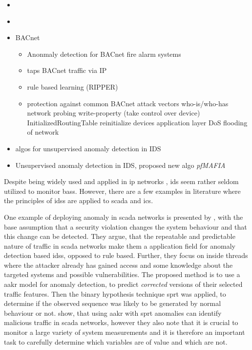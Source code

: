 

\begin{itemize}
	\item \parencite{Yang2006}
	\item \parencite{Celeda2012}
	\item \textcite{Pan2014} BACnet
	\begin{itemize}
		\item Anonmaly detection for BACnet fire alarm systems
		\item taps BACnet traffic via IP
		\item rule based learning (RIPPER)
		\item protection against common BACnet attack vectors
		\subitem who-is/who-has network probing
		\subitem write-property (take control over device)
		\subitem InitializedRoutingTable
		\subitem reinitialize devices
		\subitem application layer DoS
		\subitem flooding of network
	\end{itemize}
	
	\item \textcite{Eskin2002} algos for unsupervised anomaly detection in IDS
	\item \textcite{Leung2005} Unsupervised anomaly detection in IDS, proposed new algo \emph{pfMAFIA}
\end{itemize}

Despite being widely used and applied in \gls{ip} networks \parencite[cf.][pp.~201~ff.]{Northcutt2005}, \gls{ids} seem rather seldom utilized to monitor \glspl{bas}.
However, there are a few examples in literature where the principles of \glspl{ids} are applied to \gls{scada} and \gls{ics}.

One example of deploying anomaly in \gls{scada} networks is presented by \textcite{Yang2006}, with the base assumption that a security violation changes the system behaviour and that this change can be detected. They argue, that the repeatable and predictable nature of traffic in \gls{scada} networks make them a application field for anomaly detection based \glspl{ids}, opposed to rule based.
Further, they focus on inside threads where the attacker already has gained access and some knowledge about the targeted systems and possible vulnerabilities.
The proposed method is to use a \gls{aakr} model for anomaly detection, to predict \emph{corrected} versions of their selected traffic features. Then the binary hypothesis technique \gls{sprt} was applied, to determine if the observed sequence was likely to be generated by normal behaviour or not.
\textcite{Yang2006} show, that using \gls{aakr} with \gls{sprt} anomalies can identify malicious traffic in \gls{scada} networks, however they also note that it is crucial to monitor a large variety of system measurements and it is therefore an important task to carefully determine which variables are of value and which are not.

